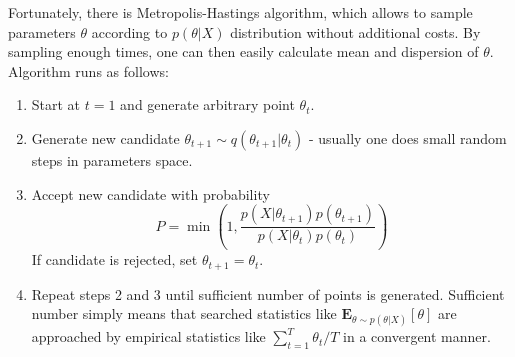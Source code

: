 \documentclass[12pt]{extarticle}
\numberwithin{problem}{section}
\numberwithin{theorem}{section}
\begin{document}
	Fortunately, there is Metropolis-Hastings algorithm, which allows to sample parameters $\theta$ according to $p(\theta|X)$ distribution without additional costs. By sampling enough times, one can then easily calculate mean and dispersion of $\theta$. Algorithm runs as follows:
	\begin{enumerate}
		\item Start at $t=1$ and generate arbitrary point $\theta_t$.
		\item Generate new candidate $\theta_{t+1}\sim q(\theta_{t+1}|\theta_t)$ - usually one does small random steps in parameters space.
		\item Accept new candidate with probability
		\begin{equation}
			P = \min\left(1, \frac{p(X|\theta_{t+1})p(\theta_{t+1})}{p(X|\theta_t)p(\theta_t)}\right)
		\end{equation} 
		If candidate is rejected, set $\theta_{t+1} = \theta_t$.
		\item Repeat steps 2 and 3 until sufficient number of points is generated. Sufficient number simply means that searched statistics like $\mathbf{E}_{\theta\sim p(\theta|X)}[\theta]$ are approached by empirical statistics like $\sum_{t=1}^T \theta_t / T$ in a convergent manner.
	\end{enumerate}
	
	
	
\end{document}
